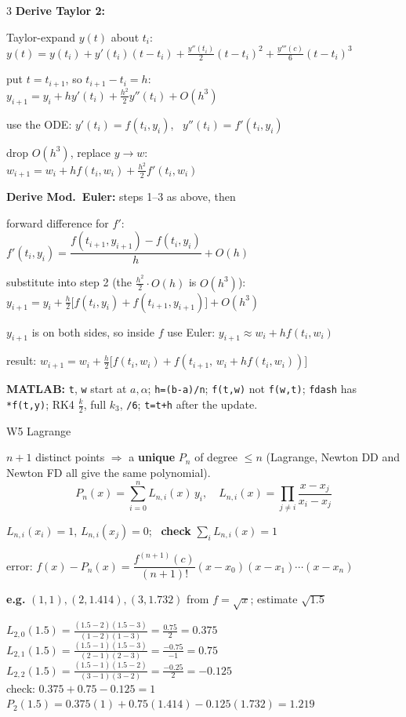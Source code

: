 \documentclass[8pt,a4paper]{extarticle}
\newcommand{\hd}[1]{\par\vspace{3pt}\noindent\colorbox{accent}{\parbox{\dimexpr\linewidth-2\fboxsep}{\color{white}\bfseries\strut #1}}\par\vspace{1pt}}
\newcommand{\sub}[1]{\textbf{\color{accent}#1}}
\newenvironment{ex}[1]{\par\vspace{2pt}\noindent\begin{lrbox}{\exbox}\begin{minipage}{\dimexpr\linewidth-2\fboxsep}\RaggedRight\color{grn}\textbf{e.g.} #1\par\setlength{\parskip}{1.5pt}}{\end{minipage}\end{lrbox}\colorbox{exbg}{\usebox{\exbox}}\par\vspace{1pt}}
\begin{document}
\begin{multicols*}{3}
\sub{Derive Taylor 2:}
\begin{der}
\item Taylor-expand $y(t)$ about $t_i$:\\
$y(t)=y(t_i)+y'(t_i)(t-t_i)+\frac{y''(t_i)}{2}(t-t_i)^2+\frac{y'''(c)}{6}(t-t_i)^3$
\item put $t=t_{i+1}$, so $t_{i+1}-t_i=h$:\\
$y_{i+1}=y_i+hy'(t_i)+\frac{h^2}{2}y''(t_i)+O(h^3)$
\item use the ODE: $y'(t_i)=f(t_i,y_i)$, \ $y''(t_i)=f'(t_i,y_i)$
\item drop $O(h^3)$, replace $y\to w$:\\
$w_{i+1}=w_i+hf(t_i,w_i)+\frac{h^2}{2}f'(t_i,w_i)$
\end{der}
\sub{Derive Mod.\ Euler:} steps 1--3 as above, then
\begin{der}[start=4]
\item forward difference for $f'$:\\
$f'(t_i,y_i)=\dfrac{f(t_{i+1},y_{i+1})-f(t_i,y_i)}{h}+O(h)$
\item substitute into step 2 (the $\frac{h^2}{2}\cdot O(h)$ is $O(h^3)$):\\
$y_{i+1}=y_i+\frac h2\big[f(t_i,y_i)+f(t_{i+1},y_{i+1})\big]+O(h^3)$
\item $y_{i+1}$ is on both sides, so inside $f$ use Euler: $y_{i+1}\approx w_i+hf(t_i,w_i)$
\item result: $w_{i+1}=w_i+\frac h2\big[f(t_i,w_i)+f(t_{i+1},\,w_i+hf(t_i,w_i))\big]$
\end{der}

\sub{MATLAB:} \texttt{t}, \texttt{w} start at $a,\alpha$; \texttt{h=(b-a)/n}; \texttt{f(t,w)} not \texttt{f(w,t)}; \texttt{fdash} has \texttt{*f(t,y)}; RK4 $\frac{k}{2}$, full $k_3$, \texttt{/6}; \texttt{t=t+h} after the update.

\hd{W5 Lagrange}
$n+1$ distinct points $\Rightarrow$ a \textbf{unique} $P_n$ of degree $\le n$ (Lagrange, Newton DD and Newton FD all give the same polynomial).
\[P_n(x)=\sum_{i=0}^nL_{n,i}(x)\,y_i,\quad L_{n,i}(x)=\prod_{j\ne i}\frac{x-x_j}{x_i-x_j}\]
\begin{tl}
\item $L_{n,i}(x_i)=1$, $L_{n,i}(x_j)=0$; \ \textbf{check} $\sum_iL_{n,i}(x)=1$
\item error: $f(x)-P_n(x)=\dfrac{f^{(n+1)}(c)}{(n+1)!}(x-x_0)(x-x_1)\cdots(x-x_n)$
\end{tl}
\begin{ex}{$(1,1),(2,1.414),(3,1.732)$ from $f=\sqrt x$; estimate $\sqrt{1.5}$}
$L_{2,0}(1.5)=\frac{(1.5-2)(1.5-3)}{(1-2)(1-3)}=\frac{0.75}{2}=0.375$\\
$L_{2,1}(1.5)=\frac{(1.5-1)(1.5-3)}{(2-1)(2-3)}=\frac{-0.75}{-1}=0.75$\\
$L_{2,2}(1.5)=\frac{(1.5-1)(1.5-2)}{(3-1)(3-2)}=\frac{-0.25}{2}=-0.125$\\
check: $0.375+0.75-0.125=1$ \checkmark\\
$P_2(1.5)=0.375(1)+0.75(1.414)-0.125(1.732)=1.219$


\end{ex}
\end{multicols*}
\end{document}

